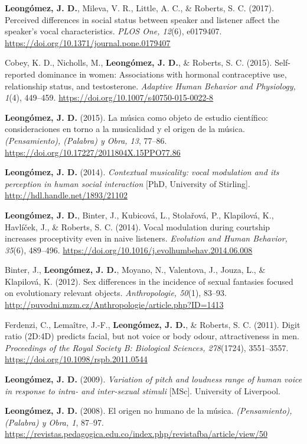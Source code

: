 \documentclass[11pt,a4paper,]{awesome-cv}
\begin{document}
\textbf{Leongómez, J. D.}, Mileva, V. R., Little, A. C., \& Roberts, S.
C. (2017). Perceived differences in social status between speaker and
listener affect the speaker's vocal characteristics. \emph{PLOS One,
12}(6), e0179407. \url{https://doi.org/10.1371/journal.pone.0179407}

Cobey, K. D., Nicholls, M., \textbf{Leongómez, J. D.}, \& Roberts, S. C.
(2015). Self-reported dominance in women: Associations with hormonal
contraceptive use, relationship status, and testosterone. \emph{Adaptive
Human Behavior and Physiology, 1}(4), 449--459.
\url{https://doi.org/10.1007/s40750-015-0022-8}

\textbf{Leongómez, J. D.} (2015). La música como objeto de estudio
científico: consideraciones en torno a la musicalidad y el origen de la
música. \emph{(Pensamiento), (Palabra) y Obra, 13}, 77--86.
\url{https://doi.org/10.17227/2011804X.15PPO77.86}

\textbf{Leongómez, J. D.} (2014). \emph{Contextual musicality: vocal
modulation and its perception in human social interaction} {[}PhD,
University of Stirling{]}. \url{http://hdl.handle.net/1893/21102}

\textbf{Leongómez, J. D.}, Binter, J., Kubicová, L., Stolařová, P.,
Klapilová, K., Havlíček, J., \& Roberts, S. C. (2014). Vocal modulation
during courtship increases proceptivity even in naive listeners.
\emph{Evolution and Human Behavior, 35}(6), 489--496.
\url{https://doi.org/10.1016/j.evolhumbehav.2014.06.008}

Binter, J., \textbf{Leongómez, J. D.}, Moyano, N., Valentova, J., Jouza,
L., \& Klapilová, K. (2012). Sex differences in the incidence of sexual
fantasies focused on evolutionary relevant objects. \emph{Anthropologie,
50}(1), 83--93.
\url{http://puvodni.mzm.cz/Anthropologie/article.php?ID=1413}

Ferdenzi, C., Lemaître, J.-F., \textbf{Leongómez, J. D.}, \& Roberts, S.
C. (2011). Digit ratio (2D:4D) predicts facial, but not voice or body
odour, attractiveness in men. \emph{Proceedings of the Royal Society B:
Biological Sciences, 278}(1724), 3551--3557.
\url{https://doi.org/10.1098/rspb.2011.0544}

\textbf{Leongómez, J. D.} (2009). \emph{Variation of pitch and loudness
range of human voice in response to intra- and inter-sexual stimuli}
{[}MSc{]}. University of Liverpool.

\textbf{Leongómez, J. D.} (2008). El origen no humano de la música.
\emph{(Pensamiento), (Palabra) y Obra, 1}, 87--97.
\url{https://revistas.pedagogica.edu.co/index.php/revistafba/article/view/50}
\end{document}
